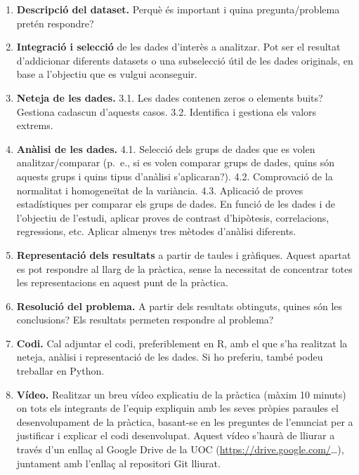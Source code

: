 \documentclass[
]{article}
\providecommand{\tightlist}{%
  \setlength{\itemsep}{0pt}\setlength{\parskip}{0pt}}
\begin{document}
\begin{enumerate}
\def\labelenumi{\arabic{enumi}.}
\tightlist
\item
  \textbf{Descripció del dataset.} Perquè és important i quina
  pregunta/problema pretén respondre?
\item
  \textbf{Integració i selecció} de les dades d'interès a analitzar. Pot
  ser el resultat d'addicionar diferents datasets o una subselecció útil
  de les dades originals, en base a l'objectiu que es vulgui aconseguir.
\item
  \textbf{Neteja de les dades.} 3.1. Les dades contenen zeros o elements
  buits? Gestiona cadascun d'aquests casos. 3.2. Identifica i gestiona
  els valors extrems.
\item
  \textbf{Anàlisi de les dades.} 4.1. Selecció dels grups de dades que
  es volen analitzar/comparar (p.~e., si es volen comparar grups de
  dades, quins són aquests grups i quins tipus d'anàlisi s'aplicaran?).
  4.2. Comprovació de la normalitat i homogeneïtat de la variància. 4.3.
  Aplicació de proves estadístiques per comparar els grups de dades. En
  funció de les dades i de l'objectiu de l'estudi, aplicar proves de
  contrast d'hipòtesis, correlacions, regressions, etc. Aplicar almenys
  tres mètodes d'anàlisi diferents.
\item
  \textbf{Representació dels resultats} a partir de taules i gràfiques.
  Aquest apartat es pot respondre al llarg de la pràctica, sense la
  necessitat de concentrar totes les representacions en aquest punt de
  la pràctica.
\item
  \textbf{Resolució del problema.} A partir dels resultats obtinguts,
  quines són les conclusions? Els resultats permeten respondre al
  problema?
\item
  \textbf{Codi.} Cal adjuntar el codi, preferiblement en R, amb el que
  s'ha realitzat la neteja, anàlisi i representació de les dades. Si ho
  preferiu, també podeu treballar en Python.
\item
  \textbf{Vídeo.} Realitzar un breu vídeo explicatiu de la pràctica
  (màxim 10 minuts) on tots els integrants de l'equip expliquin amb les
  seves pròpies paraules el desenvolupament de la pràctica, basant-se en
  les preguntes de l'enunciat per a justificar i explicar el codi
  desenvolupat. Aquest vídeo s'haurà de lliurar a través d'un enllaç al
  Google Drive de la UOC (\url{https://drive.google.com/}\ldots),
  juntament amb l'enllaç al repositori Git lliurat.
\end{enumerate}
\end{document}
